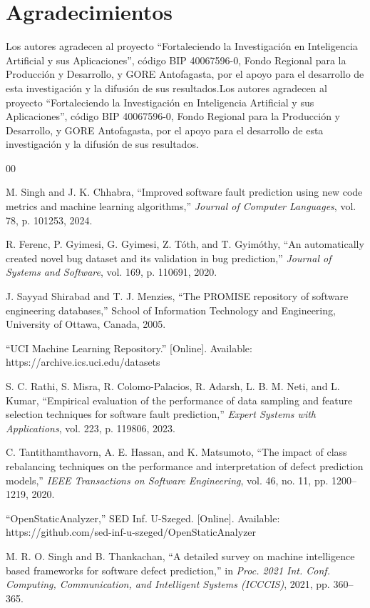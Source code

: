 \documentclass[conference,a4paper]{IEEEtran}
\newif\ifmarcarcambios
\newcommand{\cambio}[1]{\ifmarcarcambios\ifvmode\leavevmode\fi{\color{azulcambio}#1}\else#1\fi}
\begin{document}
\section*{Agradecimientos}
\cambio{Los autores agradecen al proyecto ``Fortaleciendo la Investigación en Inteligencia Artificial y sus Aplicaciones'', código BIP 40067596-0, Fondo Regional para la Producción y Desarrollo, y GORE Antofagasta, por el apoyo para el desarrollo de esta investigación y la difusión de sus resultados.}

\begin{thebibliography}{00}

 M. Singh and J. K. Chhabra, ``Improved software fault prediction using new code metrics and machine learning algorithms,'' \textit{Journal of Computer Languages}, vol. 78, p. 101253, 2024.

 R. Ferenc, P. Gyimesi, G. Gyimesi, Z. T{\'o}th, and T. Gyim{\'o}thy, ``An automatically created novel bug dataset and its validation in bug prediction,'' \textit{Journal of Systems and Software}, vol. 169, p. 110691, 2020.

 J. Sayyad Shirabad and T. J. Menzies, ``The PROMISE repository of software engineering databases,'' School of Information Technology and Engineering, University of Ottawa, Canada, 2005.

 ``UCI Machine Learning Repository.'' [Online]. Available: https://archive.ics.uci.edu/datasets

 S. C. Rathi, S. Misra, R. Colomo-Palacios, R. Adarsh, L. B. M. Neti, and L. Kumar, ``Empirical evaluation of the performance of data sampling and feature selection techniques for software fault prediction,'' \textit{Expert Systems with Applications}, vol. 223, p. 119806, 2023.

 C. Tantithamthavorn, A. E. Hassan, and K. Matsumoto, ``The impact of class rebalancing techniques on the performance and interpretation of defect prediction models,'' \textit{IEEE Transactions on Software Engineering}, vol. 46, no. 11, pp. 1200--1219, 2020.

 ``OpenStaticAnalyzer,'' SED Inf. U-Szeged. [Online]. Available: https://github.com/sed-inf-u-szeged/OpenStaticAnalyzer

 M. R. O. Singh and B. Thankachan, ``A detailed survey on machine intelligence based frameworks for software defect prediction,'' in \textit{Proc. 2021 Int. Conf. Computing, Communication, and Intelligent Systems (ICCCIS)}, 2021, pp. 360--365.


\end{thebibliography}
\end{document}
